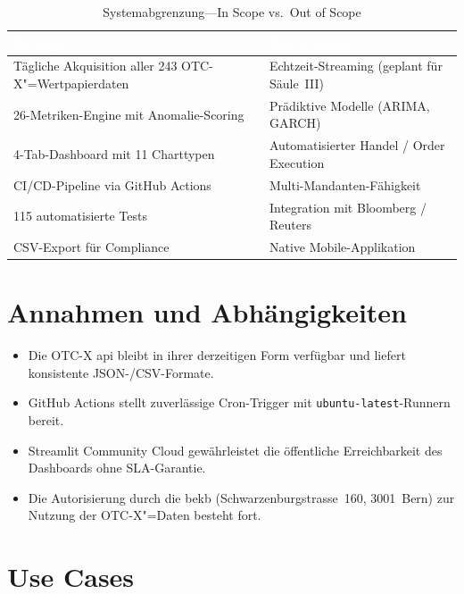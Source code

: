 \documentclass[11pt, a4paper, oneside, openany]{report}
\begin{document}
\begin{table}[H]
\centering
\caption{Systemabgrenzung\;---\;In Scope vs.\ Out of Scope}
\label{tab:abgrenzung}
\sffamily\small
\begin{tabularx}{\textwidth}{X X}
  \toprule
  \rowcolor{DeepNavy} \textcolor{white}{\textbf{In Scope}} & \textcolor{white}{\textbf{Out of Scope}} \\
  \midrule
  Tägliche Akquisition aller 243 OTC-X"=Wertpapierdaten     & Echtzeit-Streaming (geplant für Säule~III) \\
  26-Metriken-Engine mit Anomalie-Scoring                     & Prädiktive Modelle (ARIMA, GARCH) \\
  4-Tab-Dashboard mit 11 Charttypen                           & Automatisierter Handel / Order Execution \\
  CI/CD-Pipeline via GitHub Actions                           & Multi-Mandanten-Fähigkeit \\
  115 automatisierte Tests                                     & Integration mit Bloomberg / Reuters \\
  CSV-Export für Compliance                                    & Native Mobile-Applikation \\
  \bottomrule
\end{tabularx}
\end{table}

\section{Annahmen und Abhängigkeiten}

\begin{itemize}
  \item Die OTC-X \gls{api} bleibt in ihrer derzeitigen Form verfügbar und liefert konsistente JSON-/CSV-Formate.
  \item GitHub Actions stellt zuverlässige Cron-Trigger mit \texttt{ubuntu-latest}-Runnern bereit.
  \item Streamlit Community Cloud gewährleistet die öffentliche Erreichbarkeit des Dashboards ohne SLA-Garantie.
  \item Die Autorisierung durch die \gls{bekb} (Schwarzenburgstrasse~160, 3001~Bern) zur Nutzung der OTC-X"=Daten besteht fort.
\end{itemize}

\section{Use Cases}
\label{sec:usecases}
\end{document}
